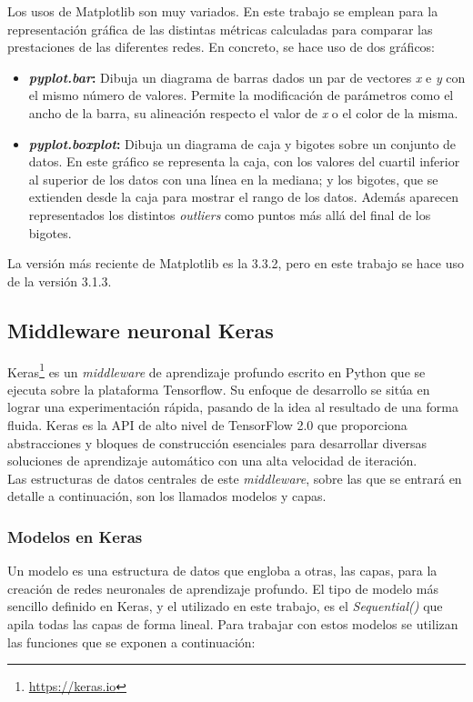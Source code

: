 Los usos de Matplotlib son muy variados. En este trabajo se emplean para la representación gráfica de las distintas métricas calculadas para comparar las prestaciones de las diferentes redes. En concreto, se hace uso de dos gráficos:

\begin{itemize}
    \item \textbf{\textit{pyplot.bar}:} Dibuja un diagrama de barras dados un par de vectores \textit{x} e \textit{y} con el mismo número de valores. Permite la modificación de parámetros como el ancho de la barra, su alineación respecto el valor de \textit{x} o el color de la misma.
    \item \textbf{\textit{pyplot.boxplot}:} Dibuja un diagrama de caja y bigotes sobre un conjunto de datos. En este gráfico se representa la caja, con los valores del cuartil inferior al superior de los datos con una línea en la mediana; y los bigotes, que se extienden desde la caja para mostrar el rango de los datos. Además aparecen representados los distintos \textit{outliers} como puntos más allá del final de los bigotes.
\end{itemize}

La versión más reciente de Matplotlib es la 3.3.2, pero en este trabajo se hace uso de la versión 3.1.3.

\subsection{Middleware neuronal Keras}
Keras\footnote{\url{https://keras.io}} es un \textit{middleware} de aprendizaje profundo escrito en Python que se ejecuta sobre la plataforma Tensorflow. Su enfoque de desarrollo se sitúa en lograr una experimentación rápida, pasando de la idea al resultado de una forma fluida. Keras es la API de alto nivel de TensorFlow 2.0 que proporciona abstracciones y bloques de construcción esenciales para desarrollar diversas soluciones de aprendizaje automático con una alta velocidad de iteración.\\

Las estructuras de datos centrales de este \textit{middleware}, sobre las que se entrará en detalle a continuación, son los llamados modelos y capas.

\subsubsection{Modelos en Keras}
Un modelo es una estructura de datos que engloba a otras, las capas, para la creación de redes neuronales de aprendizaje profundo. El tipo de modelo más sencillo definido en Keras, y el utilizado en este trabajo, es el \textit{Sequential()} que apila todas las capas de forma lineal. Para trabajar con estos modelos se utilizan las funciones que se exponen a continuación:

